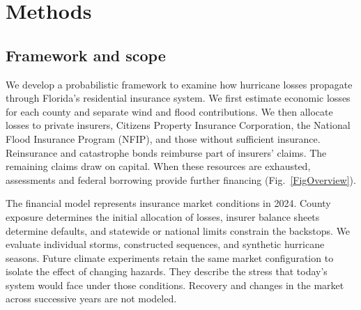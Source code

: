 \section{Methods}
\subsection{Framework and scope}\label{MainModelDescription}
We develop a probabilistic framework to examine how hurricane losses propagate through Florida's residential insurance system. We first estimate economic losses for each county and separate wind and flood contributions. We then allocate losses to private insurers, Citizens Property Insurance Corporation, the National Flood Insurance Program (NFIP), and those without sufficient insurance. Reinsurance and catastrophe bonds reimburse part of insurers' claims. The remaining claims draw on capital. When these resources are exhausted, assessments and federal borrowing provide further financing (Fig.~\ref{FigOverview}).

The financial model represents insurance market conditions in 2024. County exposure determines the initial allocation of losses, insurer balance sheets determine defaults, and statewide or national limits constrain the backstops. We evaluate individual storms, constructed sequences, and synthetic hurricane seasons. Future climate experiments retain the same market configuration to isolate the effect of changing hazards. They describe the stress that today's system would face under those conditions. Recovery and changes in the market across successive years are not modeled.

